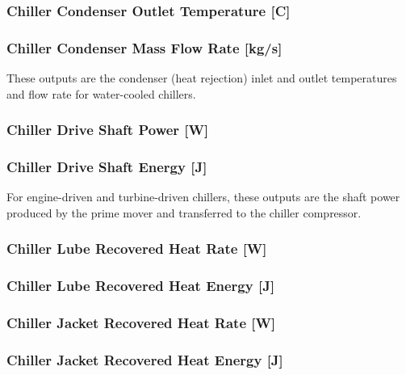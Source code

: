 \subsubsection{Chiller Condenser Outlet Temperature {[}C{]}}\label{chiller-condenser-outlet-temperature-c}

\subsubsection{Chiller Condenser Mass Flow Rate {[}kg/s{]}}\label{chiller-condenser-mass-flow-rate-kgs}

These outputs are the condenser (heat rejection) inlet and outlet temperatures and flow rate for water-cooled chillers.

\subsubsection{Chiller Drive Shaft Power {[}W{]}}\label{chiller-drive-shaft-power-w}

\subsubsection{Chiller Drive Shaft Energy {[}J{]}}\label{chiller-drive-shaft-energy-j}

For engine-driven and turbine-driven chillers, these outputs are the shaft power produced by the prime mover and transferred to the chiller compressor.

\subsubsection{Chiller Lube Recovered Heat Rate {[}W{]}}\label{chiller-lube-recovered-heat-rate-w}

\subsubsection{Chiller Lube Recovered Heat Energy {[}J{]}}\label{chiller-lube-recovered-heat-energy-j}

\subsubsection{Chiller Jacket Recovered Heat Rate {[}W{]}}\label{chiller-jacket-recovered-heat-rate-w}

\subsubsection{Chiller Jacket Recovered Heat Energy {[}J{]}}\label{chiller-jacket-recovered-heat-energy-j}

